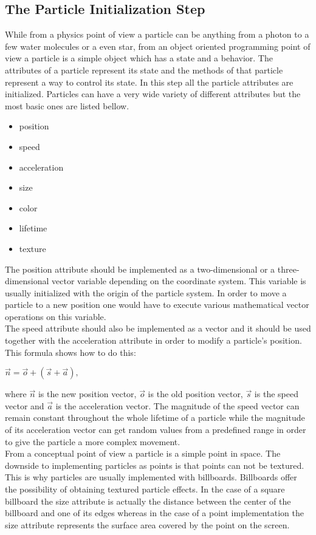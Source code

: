 \newpage
\subsection{The Particle Initialization Step}
While from a physics point of view a particle can be anything from a photon to a few water molecules or a even star, from an object oriented programming point of view a particle is a simple object which has a state and a behavior. The attributes of a particle represent its state and the methods of that particle represent a way to control its state. In this step all the particle attributes are initialized. Particles can have a very wide variety of different attributes but the most basic ones are listed bellow.
\begin{itemize}
	\item position
	\item speed
	\item acceleration
	\item size
	\item color
	\item lifetime
	\item texture
\end{itemize}

The position attribute should be implemented as a two-dimensional or a three-dimensional vector variable depending on the coordinate system. This variable is usually initialized with the origin of the particle system. In order to move a particle to a new position one would have to execute various mathematical vector operations on this variable. \\

The speed attribute should also be implemented as a vector and it should be used together with the acceleration attribute in order to modify a particle's position. This formula shows how to do this:
\begin{center}
	$\vec{n} = \vec{o} + (\vec{s} + \vec{a}),$
\end{center}
where $\vec{n}$ is the new position vector, $\vec{o}$ is the old position vector, $\vec{s}$ is the speed vector and $\vec{a}$ is the acceleration vector. The magnitude of the speed vector can remain constant throughout the whole lifetime of a particle while the magnitude of its acceleration vector can get random values from a predefined range in order to give the particle a more complex movement.\\

From a conceptual point of view a particle is a simple point in space. The downside to implementing particles as points is that points can not be textured. This is why particles are usually implemented with billboards. Billboards offer the possibility of obtaining textured particle effects. In the case of a square billboard the size attribute is actually the distance between the center of the billboard and one of its edges whereas in the case of a point implementation the size attribute represents the surface area covered by the point on the screen.\\

